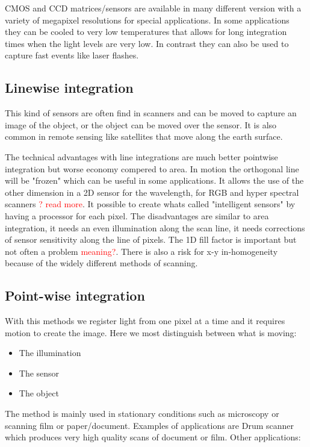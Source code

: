 CMOS and CCD matrices/sensors are available in many different version with a variety of megapixel resolutions for special applications. In some applications they can be cooled to very low temperatures that allows for long integration times when the light levels are very low. In contrast they can also be used to capture fast events like laser flashes. 

\subsection{Linewise integration}
This kind of sensors are often find in scanners and can be moved to capture an image of the object, or the object can be moved over the sensor. It is also common in remote sensing like satellites that move along the earth surface. 

The technical advantages with line integrations are much better pointwise integration but worse economy compered to area. In motion the orthogonal line will be "frozen" which can be useful in some applications. It allows the use of the other dimension in a 2D sensor for the wavelength, for RGB and hyper spectral scanners \textcolor{red}{? read more}. It possible to create whats called "intelligent sensors" by having a processor for each pixel. 
The disadvantages are similar to area integration, it needs an even illumination along the scan line, it needs corrections of sensor sensitivity along the line of pixels. The 1D fill factor is important but not often a problem \textcolor{red}{meaning?}. There is also a risk for x-y in-homogeneity because of the widely different methods of scanning.  

\subsection{Point-wise integration}
With this methods we register light from one pixel at a time and it requires motion to create the image. Here we most distinguish between what is moving:
\begin{itemize}
	\item The illumination
	\item The sensor
	\item The object
\end{itemize}
The method is mainly used in stationary conditions such as microscopy or scanning film or paper/document. Examples of applications are Drum scanner which produces very high quality scans of document or film. Other applications:

